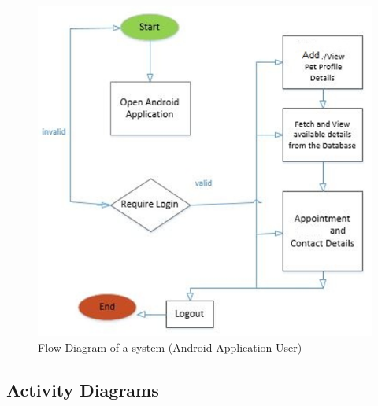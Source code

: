 \begin{enumerate}
\begin{figure}[H]
    \centering
    \includegraphics[scale=0.5]{figflowtwo}
    \caption{Flow Diagram of a system (Android Application User)}
\end{figure}
\end{enumerate}


\newpage
\subsection{Activity Diagrams}

